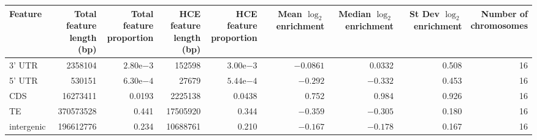 \begin{table}
    \centering
    \label{tab:sup_phastcons_enrichment}
    \begin{tabular}{lrrrrrrrr}
    \toprule
        Feature &
            \shortstack{Total feature \\ length (bp)} &
            \shortstack{Total feature \\ proportion} &
            \shortstack{HCE feature \\ length (bp)} &
            \shortstack{HCE feature \\ proportion} &
            \shortstack{Mean $\log_2$ \\ enrichment} &
            \shortstack{Median $\log_2$ \\ enrichment} &
            \shortstack{St Dev $\log_2$ \\ enrichment} &
            \shortstack{Number of \\ chromosomes} \\
    \midrule
        3' UTR     & \num{2358104}   & $2.80\mathrm{e}{-3}$ & \num{152598}   & $3.00\mathrm{e}{-3}$ & $-0.0861$    & 0.0332       & 0.508        & 16 \\
        5' UTR     & \num{530151}    & $6.30\mathrm{e}{-4}$ & \num{27679}    & $5.44\mathrm{e}{-4}$ & $-0.292$     & $-0.332$     & 0.453        & 16 \\
        CDS        & \num{16273411}  & 0.0193               & \num{2225138}  & 0.0438               & 0.752        & 0.984        & 0.926        & 16 \\
        TE         & \num{370573528} & 0.441                & \num{17505920} & 0.344                & $-0.359$     & $-0.305$     & 0.180        & 16 \\
        intergenic & \num{196612776} & 0.234                & \num{10688761} & 0.210                & $-0.167$     & $-0.178$     & 0.167        & 16 \\

\end{tabular}
\end{table}
